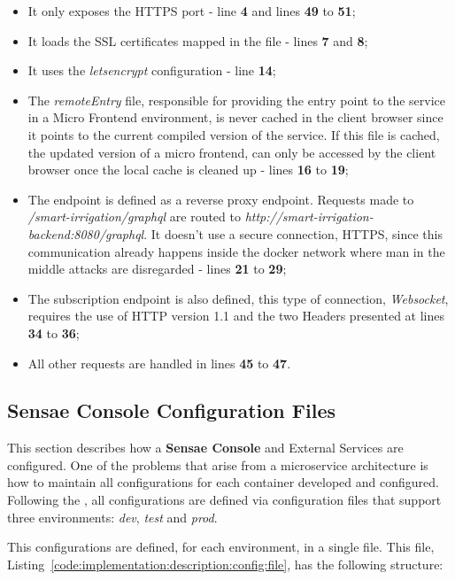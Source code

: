 \begin{itemize}
    \item It only exposes the HTTPS port - line \textbf{4} and lines \textbf{49} to \textbf{51};
    \item It loads the SSL certificates mapped in the  file - lines \textbf{7} and \textbf{8};
    \item It uses the \textit{letsencrypt} configuration - line \textbf{14};
    \item The \textit{remoteEntry} file, responsible for providing the entry point to the service in a Micro Frontend environment, is never cached in the client browser since it points to the current compiled version of the service. If this file is cached, the updated version of a micro frontend, can only be accessed by the client browser once the local cache is cleaned up - lines \textbf{16} to \textbf{19};
    \item The  endpoint is defined as a reverse proxy endpoint. Requests made to \textit{/smart-irrigation/graphql} are routed to \textit{http://smart-irrigation-backend:8080/graphql}. It doesn't use a secure connection, HTTPS, since this communication already happens inside the docker network where man in the middle attacks are disregarded - lines \textbf{21} to \textbf{29};
    \item The  subscription endpoint is also defined, this type of connection, \textit{Websocket}, requires the use of HTTP version 1.1 and the two Headers presented at lines \textbf{34} to \textbf{36};
    \item All other requests are handled in lines \textbf{45} to \textbf{47}.
\end{itemize}

\subsection{Sensae Console Configuration Files}
\label{subsec:implementation:description:config}

This section describes how a \textbf{Sensae Console} and External Services are configured. One of the problems that arise from a microservice architecture is how to maintain all configurations for each container developed and configured. Following the , all configurations are defined via configuration files that support three environments: \textit{dev}, \textit{test} and \textit{prod}.

This configurations are defined, for each environment, in a single file. This file, Listing~\ref{code:implementation:description:config:file}, has the following structure:

